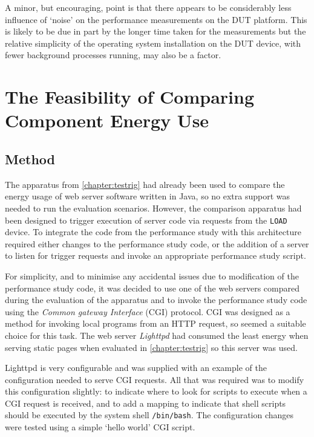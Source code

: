 A minor, but encouraging, point is that there appears to be considerably less influence of `noise' on the performance measurements on the DUT platform. This is likely to be due in part by the longer time taken for the measurements but the relative simplicity of the operating system installation on the DUT device, with fewer background processes running, may also be a factor.

\section{The Feasibility of Comparing Component Energy Use}
\label{section:fse}

\subsection{Method}
\label{fse methodology}

The apparatus from \autoref{chapter:testrig} had already been used to compare the energy usage of web server software written in Java, so no extra support was needed to run the evaluation scenarios. However, the comparison apparatus had been designed to trigger execution of server code via requests from the \texttt{LOAD} device. To integrate the code from the performance study with this architecture required either changes to the performance study code, or the addition of a server to listen for trigger requests and invoke an appropriate performance study script.

For simplicity, and to minimise any accidental issues due to modification of the performance study code, it was decided to use one of the web servers compared during the evaluation of the apparatus and to invoke the performance study code using the \emph{Common gateway Interface} (CGI) protocol. CGI was designed as a method for invoking local programs from an HTTP request, so seemed a suitable choice for this task. The web server \emph{Lighttpd} had consumed the least energy when serving static pages when evaluated in \autoref{chapter:testrig} so this server was used.

Lighttpd is very configurable and was supplied with an example of the configuration needed to serve CGI requests. All that was required was to modify this configuration slightly: to indicate where to look for scripts to execute when a CGI request is received, and to add a mapping to indicate that shell scripts should be executed by the system shell \verb!/bin/bash!. The configuration changes were tested using a simple `hello world' CGI script.

